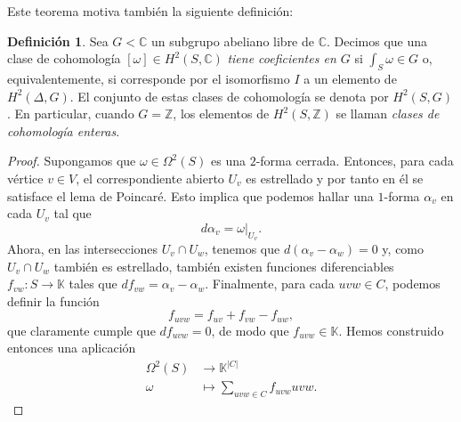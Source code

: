 \documentclass[12pt,a4paper]{article}
\theoremstyle{definition} \newtheorem{defn}[thm]{Definición}
\theoremstyle{definition} \newtheorem{ejemplo}[thm]{Ejemplo}
\theoremstyle{definition} \newtheorem{ejercicio}[thm]{Ejercicio}
\def\CC{\mathbb{C}}
\begin{document}
    Este teorema motiva también la siguiente definición:
    \begin{defn}
      Sea $G<\CC$ un subgrupo abeliano libre de $\CC$. Decimos que una clase de cohomología $[\omega] \in H^2(S,\CC)$ \emph{tiene coeficientes en $G$} si $\int_S \omega \in G$ o, equivalentemente, si corresponde por el isomorfismo $I$ a un elemento de $H^2(\Delta,G)$. El conjunto de estas clases de cohomología se denota por $H^2(S,G)$. En particular, cuando $G=\mathbb{Z}$, los elementos de $H^2(S,\mathbb{Z})$ se llaman \emph{clases de cohomología enteras}.
    \end{defn}

    \begin{proof}
      Supongamos que $\omega \in \Omega^2(S)$ es una $2$-forma cerrada. Entonces, para cada vértice $v\in V$, el correspondiente abierto $U_v$ es estrellado y por tanto en él se satisface el lema de Poincaré. Esto implica que podemos hallar una $1$-forma $\alpha_v$ en cada $U_v$ tal que
      \begin{equation*}
	d\alpha_v = \omega|_{U_v}.
      \end{equation*}
      Ahora, en las intersecciones $U_v \cap U_w$, tenemos que $d(\alpha_v - \alpha_w)=0$ y, como $U_v \cap U_w$ también es estrellado, también existen funciones diferenciables $f_{vw}: S \rightarrow \mathbb{K}$ tales que $df_{vw} = \alpha_v - \alpha_w$. Finalmente, para cada $uvw \in C$, podemos definir la función
      \begin{equation*}
	f_{uvw} = f_{uv} + f_{vw} - f_{uw},
      \end{equation*}
      que claramente cumple que $d f_{uvw} = 0$, de modo que $f_{uvw} \in \mathbb{K}$. Hemos construido entonces una aplicación
      \begin{align*}
	\Omega^2(S) &\longrightarrow \mathbb{K}^{|C|}\\ 
	\omega &\longmapsto \sum_{uvw \in C} f_{uvw} uvw. 
	\end{align*}


\end{proof}
\end{document}
